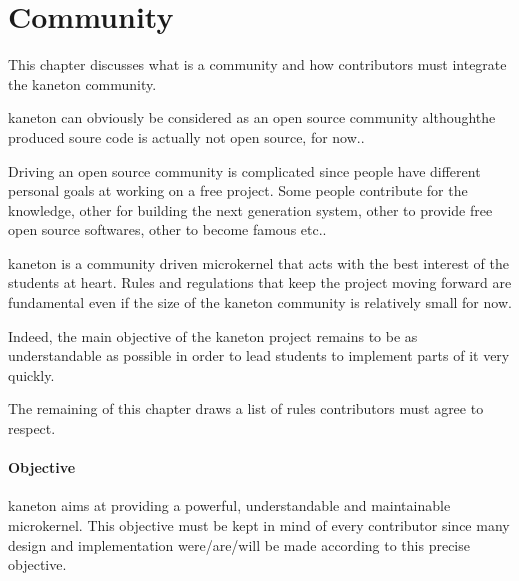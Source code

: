 %
%
%
%
%
%

%
%

\chapter{Community}

This chapter discusses what is a community and how contributors must integrate
the kaneton community.

\newpage

%
%

kaneton can obviously be considered as an open source community althoughthe
produced soure code is actually not open source, for now..

Driving an open source community is complicated since people have different
personal goals at working on a free project. Some people contribute for
the knowledge, other for building the next generation system, other to
provide free open source softwares, other to become famous etc..

kaneton is a community driven microkernel that acts with the best interest of
the students at heart. Rules and regulations that keep the project moving
forward are fundamental even if the size of the kaneton community is
relatively small for now.

Indeed, the main objective of the kaneton project remains to be as
understandable as possible in order to lead students to implement parts of
it very quickly.

The remaining of this chapter draws a list of rules contributors must agree
to respect.


\subsubsection{Objective}

kaneton aims at providing a powerful, understandable and maintainable
microkernel. This objective must be kept in mind of every contributor
since many design and implementation were/are/will be made according to
this precise objective.

